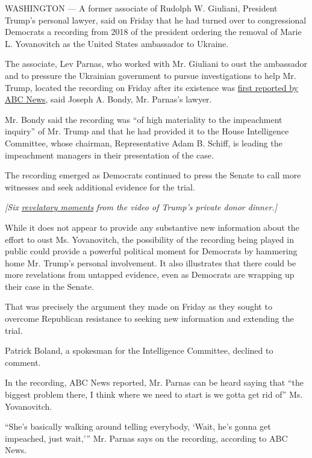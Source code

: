 WASHINGTON --- A former associate of Rudolph W. Giuliani, President
Trump's personal lawyer, said on Friday that he had turned over to
congressional Democrats a recording from 2018 of the president ordering
the removal of Marie L. Yovanovitch as the United States ambassador to
Ukraine.

The associate, Lev Parnas, who worked with Mr. Giuliani to oust the
ambassador and to pressure the Ukrainian government to pursue
investigations to help Mr. Trump, located the recording on Friday after
its existence was
\href{https://abcnews.go.com/Politics/recording-appears-capture-trump-private-dinner-ukraine-ambassador/story?id=68506437}{first
reported by ABC News}, said Joseph A. Bondy, Mr. Parnas's lawyer.

Mr. Bondy said the recording was ``of high materiality to the
impeachment inquiry'' of Mr. Trump and that he had provided it to the
House Intelligence Committee, whose chairman, Representative Adam B.
Schiff, is leading the impeachment managers in their presentation of the
case.

The recording emerged as Democrats continued to press the Senate to call
more witnesses and seek additional evidence for the trial.

\emph{{[}Six}
\href{https://www.nytimes.com/2020/01/26/us/politics/trump-recording-parnas-ukraine.html}{\emph{revelatory
moments}} \emph{from the video of Trump's private donor dinner.{]}}

While it does not appear to provide any substantive new information
about the effort to oust Ms. Yovanovitch, the possibility of the
recording being played in public could provide a powerful political
moment for Democrats by hammering home Mr. Trump's personal involvement.
It also illustrates that there could be more revelations from untapped
evidence, even as Democrats are wrapping up their case in the Senate.

That was precisely the argument they made on Friday as they sought to
overcome Republican resistance to seeking new information and extending
the trial.

Patrick Boland, a spokesman for the Intelligence Committee, declined to
comment.

In the recording, ABC News reported, Mr. Parnas can be heard saying that
``the biggest problem there, I think where we need to start is we gotta
get rid of'' Ms. Yovanovitch.

``She's basically walking around telling everybody, `Wait, he's gonna
get impeached, just wait,''' Mr. Parnas says on the recording, according
to ABC News.

